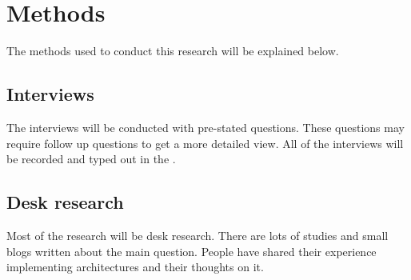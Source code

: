\section{Methods}

The methods used to conduct this research will be explained below.

\subsection{Interviews}
The interviews will be conducted with pre-stated questions. These questions may require follow up questions to get a more detailed view. All of the interviews will be recorded and typed out in the .

\subsection{Desk research}
Most of the research will be desk research. There are lots of studies and small blogs written about the main question. People have shared their experience implementing architectures and their thoughts on it.
